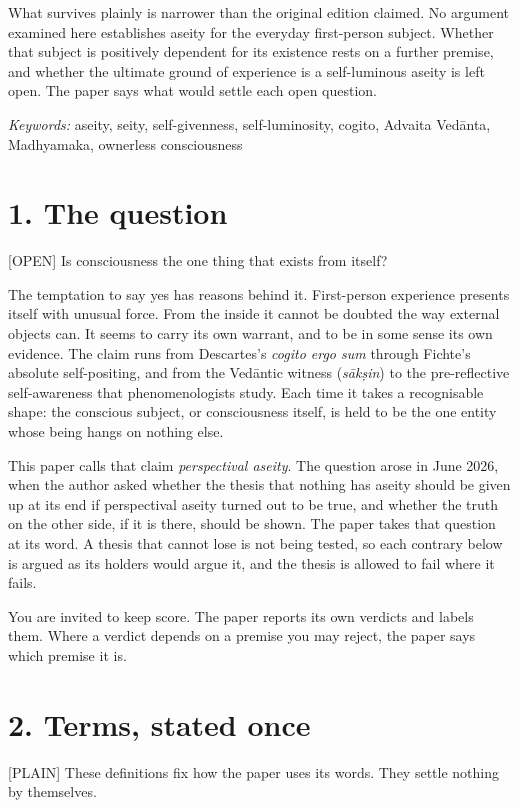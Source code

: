 \documentclass[11pt]{article}
\newcommand{\register}[1]{{\ttfamily\small #1}}
\begin{document}
What survives plainly is narrower than the original edition claimed. No argument examined here establishes aseity for the everyday first-person subject. Whether that subject is positively dependent for its existence rests on a further premise, and whether the ultimate ground of experience is a self-luminous aseity is left open. The paper says what would settle each open question.

\emph{Keywords:} aseity, seity, self-givenness, self-luminosity, cogito, Advaita Vedānta, Madhyamaka, ownerless consciousness

\section*{1. The question}

\register{[OPEN]} Is consciousness the one thing that exists from itself?

The temptation to say yes has reasons behind it. First-person experience presents itself with unusual force. From the inside it cannot be doubted the way external objects can. It seems to carry its own warrant, and to be in some sense its own evidence. The claim runs from Descartes's \emph{cogito ergo sum} through Fichte's absolute self-positing, and from the Vedāntic witness (\emph{sākṣin}) to the pre-reflective self-awareness that phenomenologists study. Each time it takes a recognisable shape: the conscious subject, or consciousness itself, is held to be the one entity whose being hangs on nothing else.

This paper calls that claim \emph{perspectival aseity}. The question arose in June 2026, when the author asked whether the thesis that nothing has aseity should be given up at its end if perspectival aseity turned out to be true, and whether the truth on the other side, if it is there, should be shown. The paper takes that question at its word. A thesis that cannot lose is not being tested, so each contrary below is argued as its holders would argue it, and the thesis is allowed to fail where it fails.

You are invited to keep score. The paper reports its own verdicts and labels them. Where a verdict depends on a premise you may reject, the paper says which premise it is.

\section*{2. Terms, stated once}

\register{[PLAIN]} These definitions fix how the paper uses its words. They settle nothing by themselves.
\end{document}
